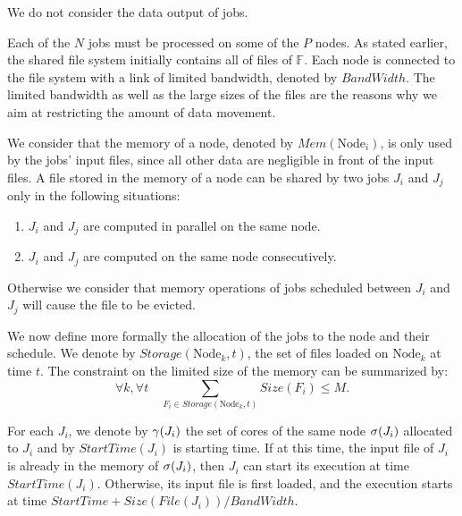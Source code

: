 \documentclass[conference,10pt]{IEEEtran}
\newcommand{\Node}[1]{\ensuremath{\mathrm{Node}_{#1}}\xspace}
\newcommand{\file}{\ensuremath{\mathit{File}}\xspace}
\newcommand{\storage}{\ensuremath{\mathit{Storage}}\xspace}
\newcommand{\size}{\ensuremath{\mathit{Size}}\xspace}
\newcommand{\memory}{\ensuremath{\mathit{Mem}}\xspace}
\newcommand{\bandwidth}{\mathit{BandWidth}\xspace}
\newcommand{\start}{\mathit{StartTime}\xspace}
\newcommand{\allocatednode}{\ensuremath\mathit{\sigma}\xspace}
\newcommand{\allocatedcores}{\ensuremath\mathit{\gamma}\xspace}
\newcommand{\fileset}{\ensuremath{\mathbb{F}}\xspace}
\begin{document}
We do not consider the data output of jobs.

Each of the $N$ jobs must be processed on some of the $P$ nodes.  As
stated earlier, the shared file system initially contains all of files
of $\fileset$.  Each node is connected to the file system with a link
of limited bandwidth, denoted by $\bandwidth$.  The limited bandwidth
as well as the large sizes of the files are the reasons why we aim at
restricting the amount of data movement.

We consider that the memory of a node, denoted by $\memory(\Node{i})$,
is only used by the jobs' input files, since all other data are
negligible in front of the input files.
A file stored in the memory of a node can be shared by two jobs $J_i$ and $J_j$ only in the following situations:
\begin{enumerate}
	\item $J_i$ and $J_j$ are computed in parallel on the same node.
	\item $J_i$ and $J_j$ are computed on the same node consecutively.
\end{enumerate}
Otherwise we consider that memory operations of jobs scheduled between
$J_i$ and $J_j$ will cause the file to be evicted.

We now define more formally the allocation of the jobs to the node and
their schedule.
We denote by $\storage(\Node{k}, t)$, the set of files loaded on $\Node{k}$
at time $t$. The constraint on the limited size of the memory can be
summarized by:
$$
\forall k,\forall t \quad \sum_{F_i\in \storage(\Node{k},t)} \size(F_i)\leq M.
$$

For each $J_i$, we denote by
$\allocatedcores(J_i)$ the set of cores of the same node
$\allocatednode(J_i)$ allocated to $J_i$ and by
$\start(J_i)$ is starting time. If at this time, the input file of
$J_i$ is already in the memory of $\allocatednode(J_i)$, then $J_i$
can start its execution at time $\start(J_i)$. Otherwise, its input
file is first loaded, and the execution starts at time 
$\start+\size(\file(J_i))/\bandwidth$.

\end{document}
